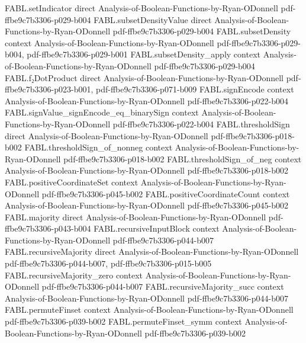 \begin{theorem}
\proofstep
  {FABL.setIndicator}
  {direct}
  {Analysis-of-Boolean-Functions-by-Ryan-ODonnell}
  {pdf-ffbe9c7b3306-p029-b004}
\proofstep
  {FABL.subsetDensityValue}
  {direct}
  {Analysis-of-Boolean-Functions-by-Ryan-ODonnell}
  {pdf-ffbe9c7b3306-p029-b004}
\proofstep
  {FABL.subsetDensity}
  {context}
  {Analysis-of-Boolean-Functions-by-Ryan-ODonnell}
  {pdf-ffbe9c7b3306-p029-b004,
    pdf-ffbe9c7b3306-p029-b001}
\proofstep
  {FABL.subsetDensity_apply}
  {context}
  {Analysis-of-Boolean-Functions-by-Ryan-ODonnell}
  {pdf-ffbe9c7b3306-p029-b004}
\proofstep
  {FABL.f₂DotProduct}
  {direct}
  {Analysis-of-Boolean-Functions-by-Ryan-ODonnell}
  {pdf-ffbe9c7b3306-p023-b001,
    pdf-ffbe9c7b3306-p071-b009}
\proofstep
  {FABL.signEncode}
  {context}
  {Analysis-of-Boolean-Functions-by-Ryan-ODonnell}
  {pdf-ffbe9c7b3306-p022-b004}
\proofstep
  {FABL.signValue_signEncode_eq_binarySign}
  {context}
  {Analysis-of-Boolean-Functions-by-Ryan-ODonnell}
  {pdf-ffbe9c7b3306-p022-b004}
\proofstep
  {FABL.thresholdSign}
  {direct}
  {Analysis-of-Boolean-Functions-by-Ryan-ODonnell}
  {pdf-ffbe9c7b3306-p018-b002}
\proofstep
  {FABL.thresholdSign_of_nonneg}
  {context}
  {Analysis-of-Boolean-Functions-by-Ryan-ODonnell}
  {pdf-ffbe9c7b3306-p018-b002}
\proofstep
  {FABL.thresholdSign_of_neg}
  {context}
  {Analysis-of-Boolean-Functions-by-Ryan-ODonnell}
  {pdf-ffbe9c7b3306-p018-b002}
\proofstep
  {FABL.positiveCoordinateSet}
  {context}
  {Analysis-of-Boolean-Functions-by-Ryan-ODonnell}
  {pdf-ffbe9c7b3306-p045-b002}
\proofstep
  {FABL.positiveCoordinateCount}
  {context}
  {Analysis-of-Boolean-Functions-by-Ryan-ODonnell}
  {pdf-ffbe9c7b3306-p045-b002}
\proofstep
  {FABL.majority}
  {direct}
  {Analysis-of-Boolean-Functions-by-Ryan-ODonnell}
  {pdf-ffbe9c7b3306-p043-b004}
\proofstep
  {FABL.recursiveInputBlock}
  {context}
  {Analysis-of-Boolean-Functions-by-Ryan-ODonnell}
  {pdf-ffbe9c7b3306-p044-b007}
\proofstep
  {FABL.recursiveMajority}
  {direct}
  {Analysis-of-Boolean-Functions-by-Ryan-ODonnell}
  {pdf-ffbe9c7b3306-p044-b007,
    pdf-ffbe9c7b3306-p015-b005}
\proofstep
  {FABL.recursiveMajority_zero}
  {context}
  {Analysis-of-Boolean-Functions-by-Ryan-ODonnell}
  {pdf-ffbe9c7b3306-p044-b007}
\proofstep
  {FABL.recursiveMajority_succ}
  {context}
  {Analysis-of-Boolean-Functions-by-Ryan-ODonnell}
  {pdf-ffbe9c7b3306-p044-b007}
\proofstep
  {FABL.permuteFinset}
  {context}
  {Analysis-of-Boolean-Functions-by-Ryan-ODonnell}
  {pdf-ffbe9c7b3306-p039-b002}
\proofstep
  {FABL.permuteFinset_symm}
  {context}
  {Analysis-of-Boolean-Functions-by-Ryan-ODonnell}
  {pdf-ffbe9c7b3306-p039-b002}

\end{theorem}
